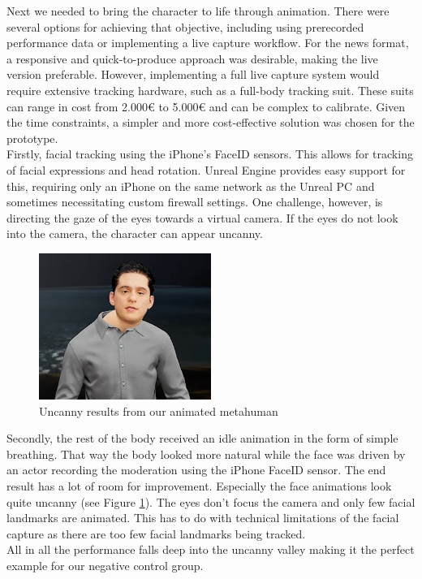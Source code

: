 \documentclass[
  a4paper,  %
  twoside,  %
  bibliography=totoc,
  headsepline,
  cleardoublepage=empty,
  parskip=half,
  draft=false
]{scrbook}
\begin{document}
Next we needed to bring the character to life through animation. There were several options for achieving that objective, including using prerecorded performance data or implementing a live capture workflow. For the news format, a responsive and quick-to-produce approach was desirable, making the live version preferable. However, implementing a full live capture system would require extensive tracking hardware, such as a full-body tracking suit. These suits can range in cost from 2.000€ to 5.000€ and can be complex to calibrate. Given the time constraints, a simpler and more cost-effective solution was chosen for the prototype. \\
Firstly, facial tracking using the iPhone's FaceID sensors. This allows for tracking of facial expressions and head rotation. Unreal Engine provides easy support for this, requiring only an iPhone on the same network as the Unreal PC and sometimes necessitating custom firewall settings. One challenge, however, is directing the gaze of the eyes towards a virtual camera. If the eyes do not look into the camera, the character can appear uncanny.
\begin{figure}[h]
  \centering
  \includegraphics[width=0.5\textwidth]{graphics/images/unreal-engine/MH/bent-head.png}
  \caption{Uncanny results from our animated metahuman}
  \label{fig:uncanny mh}
\end{figure}
Secondly, the rest of the body received an idle animation in the form of simple breathing. That way the body looked more natural while the face was driven by an actor recording the moderation using the iPhone FaceID sensor. The end result has a lot of room for improvement. Especially the face animations look quite uncanny (see Figure \ref{fig:uncanny mh}). The eyes don't focus the camera and only few facial landmarks are animated. This has to do with technical limitations of the facial capture as there are too few facial landmarks being tracked. \\
All in all the performance falls deep into the uncanny valley making it the perfect example for our negative control group. 
\end{document}
